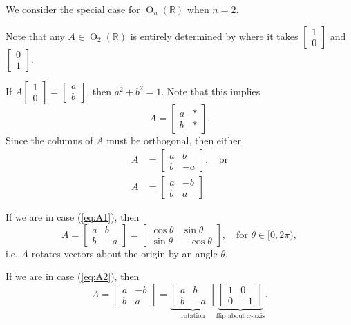 We consider the special case for $\operatorname{O}_n(\mathbb R)$ when $n=2$.

Note that any $A\in\operatorname{O}_2(\mathbb R)$ is entirely determined by where it takes $\begin{bmatrix}1\\0\end{bmatrix}$ and $\begin{bmatrix}0\\1\end{bmatrix}$.

If $A\begin{bmatrix}1\\0\end{bmatrix}=\begin{bmatrix}a\\b\end{bmatrix}$, then $a^2+b^2=1$. Note that this implies
$$A=\begin{bmatrix}
	a & * \\ b & *
\end{bmatrix}.$$
Since the columns of $A$ must be orthogonal, then either
\begin{align}
	A&=\begin{bmatrix}
	a & b \\ b & -a
\end{bmatrix},\quad\text{or}\label{eq:A1}\\
	A&=\begin{bmatrix}
	a & -b \\ b & a
\end{bmatrix}\label{eq:A2}
\end{align}

If we are in case (\ref{eq:A1}), then
$$A=\begin{bmatrix}
	a & b \\ b & -a
\end{bmatrix}=\begin{bmatrix}
	\cos\theta & \sin\theta \\ \sin\theta & -\cos\theta
\end{bmatrix},\quad\text{for $\theta\in[0,2\pi)$},$$
i.e. $A$ rotates vectors about the origin by an angle $\theta$.

If we are in case (\ref{eq:A2}), then
$$A=\begin{bmatrix}
	a & -b \\ b & a
\end{bmatrix}=\underbrace{\begin{bmatrix}
	a & b \\ b & -a
\end{bmatrix}}_\text{rotation}\underbrace{\begin{bmatrix}
	1 & 0 \\ 0 & -1
\end{bmatrix}}_\text{flip about $x$-axis}.$$